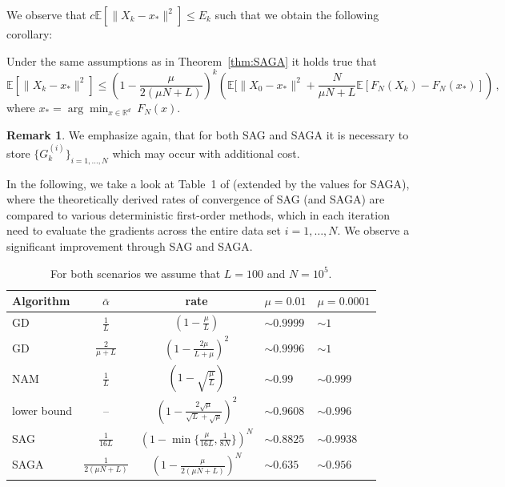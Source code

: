 \documentclass[12pt,openany]{book}
\theoremstyle{definition}
\newtheorem{remark}[thm]{Remark}
\theoremstyle{definition}
\newcommand{\E}{\mathbb{E}}
\newcommand{\R}{\mathbb{R}}
\begin{document}
We observe that $c\E[\|X_k-x_\ast\|^2]\le E_k$ such that we obtain the following corollary:

\begin{cor}
Under the same assumptions as in Theorem~\ref{thm:SAGA} it holds true that
\[\E[\|X_k-x_\ast\|^2] \le \left(1-\frac{\mu}{2(\mu N+ L)}\right)^k\left(\E[\|X_0-x_\ast\|^2 + \frac{N}{\mu N + L}\E[F_N(X_k)-F_N(x_\ast)] \right)\,, \]
where $x_\ast =\arg\min_{x\in\R^d}\ F_N(x)$.
\end{cor}

\begin{remark}
We emphasize again, that for both SAG and SAGA it is necessary to store $\{G_k^{(i)}\}_{i=1,\dots,N}$ which may occur with additional cost. 
\end{remark}

In the following, we take a look at Table~1 of \cite{Schmidt2017} (extended by the values for SAGA), where the theoretically derived rates of convergence of SAG (and SAGA) are compared to various deterministic first-order methods, which in each iteration need to evaluate the gradients across the entire data set $i=1,\dots,N$. We observe a significant improvement through SAG and SAGA.

\begin{table}[htb!]
\begin{center}
\begin{tabular}{|l|c|c|l|l|}
\hline
Algorithm & $\bar\alpha$ & rate & $\mu=0.01$ & $\mu = 0.0001$\\
\hline 
\parbox[0pt][3em][c]{0cm}{}GD & $\frac1L$ & $(1-\frac\mu{L})$ & $\sim 0.9999$ & $\sim 1$\\
\parbox[0pt][3em][c]{0cm}{}GD & $\frac{2}{\mu+L}$ & $(1-\frac{2\mu}{L+\mu})^2$ & $\sim0.9996$ & $\sim 1$\\
\parbox[0pt][3em][c]{0cm}{}NAM & $\frac1L$ & $(1-\sqrt{\frac{\mu}{L}})$ & $\sim 0.99$ & $\sim 0.999$\\
\hline
\parbox[0pt][3em][c]{0cm}{}lower bound & -- & $(1-\frac{2\sqrt{\mu}}{\sqrt{L}+\sqrt{\mu}})^2$ & $\sim 0.9608$ & $\sim 0.996$\\
\hline 
\parbox[0pt][3em][c]{0cm}{}SAG & $\frac1{16L}$ & $(1-\min\{\frac{\mu}{16L},\frac{1}{8N}\})^N$ & $\sim0.8825$ & $\sim0.9938$\\
\parbox[0pt][3em][c]{0cm}{}SAGA & $\frac{1}{2(\mu N + L)}$ & $(1-\frac{\mu}{2(\mu N+ L)})^N$ & $\sim0.635$ & $\sim0.956$\\
\hline
\end{tabular}
\caption{For both scenarios we assume that $L=100$ and $N=10^5$.}\label{tab:SAG}
\end{center}
\end{table}
\end{document}

